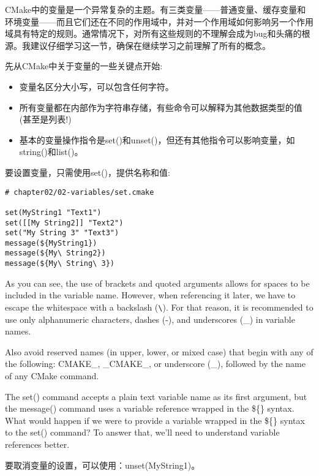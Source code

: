 
CMake中的变量是一个异常复杂的主题。有三类变量——普通变量、缓存变量和环境变量——而且它们还在不同的作用域中，并对一个作用域如何影响另一个作用域具有特定的规则。通常情况下，对所有这些规则的不理解会成为bug和头痛的根源。我建议仔细学习这一节，确保在继续学习之前理解了所有的概念。

先从CMake中关于变量的一些关键点开始:

\begin{itemize}
\item 
变量名区分大小写，可以包含任何字符。

\item 
所有变量都在内部作为字符串存储，有些命令可以解释为其他数据类型的值(甚至是列表!)

\item 
基本的变量操作指令是set()和unset()，但还有其他指令可以影响变量，如string()和list()。
\end{itemize}

要设置变量，只需使用set()，提供名称和值:

\begin{lstlisting}[style=styleCMake]
# chapter02/02-variables/set.cmake

set(MyString1 "Text1")
set([[My String2]] "Text2")
set("My String 3" "Text3")
message(${MyString1})
message(${My\ String2})
message(${My\ String\ 3})
\end{lstlisting}

As you can see, the use of brackets and quoted arguments allows for spaces to be included in the variable name. However, when referencing it later, we have to escape the whitespace with a backslash (\verb|\|). For that reason, it is recommended to use only alphanumeric characters, dashes (-), and underscores (\_) in variable names.

Also avoid reserved names (in upper, lower, or mixed case) that begin with any of the following: CMAKE\_, \_CMAKE\_, or underscore (\_), followed by the name of any CMake command.

\begin{tcolorbox}[colback=blue!5!white,colframe=blue!75!black,title=Note]
The set() command accepts a plain text variable name as its first argument, but the message() command uses a variable reference wrapped in the \$\{\} syntax. What would happen if we were to provide a variable wrapped in the \$\{\} syntax to the set() command? To answer that, we'll need to understand variable references better.
\end{tcolorbox}

要取消变量的设置，可以使用：unset(MyString1)。

